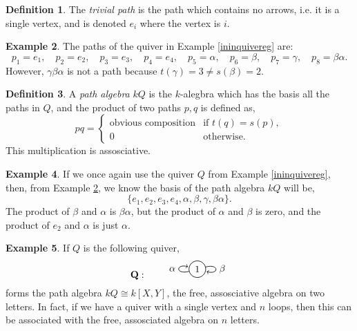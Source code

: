 \documentclass[11.5pt, twoside, a4paper, titlepage]{report}
\providecommand{\equ}[0]{\begin{equation*}}
\providecommand{\eequ}[0] {\end{equation*}}
\theoremstyle{definition}
\newtheorem{mydef}{Definition}[section]
\newtheorem{eg}[mydef]{Example}
\theoremstyle{plain}
\begin{document}
\begin{mydef}
The \emph{trivial path} is the path which contains no arrows, i.e. it is a single vertex, and is denoted $e_i$ where the vertex is $i$.
\end{mydef}

\begin{eg} \label{ininpatheg}
The paths of the quiver in Example \ref{ininquivereg} are:
\equ
p_1=e_1, \quad p_2=e_2, \quad p_3=e_3, \quad p_4=e_4, \quad p_5=\alpha, \quad p_6=\beta, \quad p_7=\gamma, \quad p_8=\beta\alpha.
\eequ
However, $\gamma\beta\alpha$ is not a path because $t(\gamma)=3\neq s(\beta)=2$.
\end{eg}

\begin{mydef}
A \emph{path algebra} $kQ$ is the $k$-alegbra which has the basis all the paths in $Q$, and the product of two paths $p,q$ is defined as,
\equ
pq=\begin{cases}
\text{obvious composition} & \text{if } t(q)=s(p),\\
0 & \text{otherwise.}
\end{cases}
\eequ
This multiplication is assosciative.
\end{mydef}

\begin{eg}
If we once again use the quiver $Q$ from Example \ref{ininquivereg}, then, from Example \ref{ininpatheg}, we know the basis of the path algebra $kQ$ will be,
\equ
\{e_1, e_2, e_3, e_4,\alpha, \beta, \gamma, \beta\alpha\}.
\eequ
The product of $\beta$ and $\alpha$ is $\beta\alpha$, but the product of $\alpha$ and $\beta$ is zero, and the product of $e_2$ and $\alpha$ is just $\alpha$.
\end{eg}

\begin{eg}
If $Q$ is the following quiver,
\equ
\mathbf{Q}: \qquad
\begin{tikzpicture}[->,-latex, auto, every path/.style={->, semithick}, main node/.style={draw, circle}]
\node	[main node]		(1) at (0,0)		{1};

\draw (1) edge[loop left] node [auto] {$\alpha$} (1);
\draw (1) edge [loop right] node [auto] {$\beta$} (1);
\end{tikzpicture}
\eequ
forms the path algebra $kQ\cong k[X, Y]$, the free, assosciative algebra on two letters. In fact, if we have a quiver with a single vertex and $n$ loops, then this can be associated with the free, assosciated algebra on $n$ letters.
\end{eg}
\end{document}

